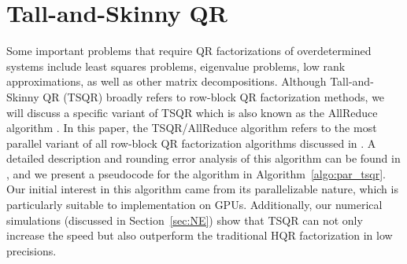 \documentclass[review,onefignum,onetabnum]{siamart190516}
\newcommand{\bb}[1]{\mathbf{#1}}
\newcommand{\fl}{\mathrm{fl}}
\begin{document}
%

\section{Tall-and-Skinny QR}
\label{sec:TSQR}
	Some important problems that require QR factorizations of overdetermined systems include least squares problems, eigenvalue problems, low rank approximations, as well as other matrix decompositions.
	Although Tall-and-Skinny QR (TSQR) broadly refers to row-block QR factorization methods, we will discuss a specific variant of TSQR which is also known as the AllReduce algorithm \cite{Mori2012}.
	In this paper, the TSQR/AllReduce algorithm refers to the most parallel variant of all row-block QR factorization algorithms discussed in \cite{Demmel2012}.
	A detailed description and rounding error analysis of this algorithm can be found in \cite{Mori2012}, and we present a pseudocode for the algorithm in Algorithm~\ref{algo:par_tsqr}.
	Our initial interest in this algorithm came from its parallelizable nature, which is particularly suitable to implementation on GPUs. 
	Additionally, our numerical simulations (discussed in Section~\ref{sec:NE}) show that TSQR can not only increase the speed but also outperform the traditional HQR factorization in low precisions.
\end{document}
